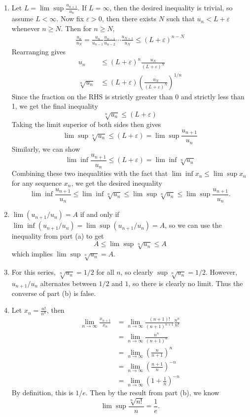 \documentclass[10pt]{amsart}
\theoremstyle{plain}
\theoremstyle{definition}
\begin{document}
\begin{enumerate}
	\item 
		Let $L = \lim\sup \frac{u_{n+1}}{u_n} $. If $L=\infty$, then the desired inequality is trivial, so assume $L < \infty$. Now fix $\varepsilon>0$, then there exists $N$ such that $u_n < L+\varepsilon$ whenever $n \geq N$. Then for $n \geq N$,
		\begin{align*}
			\frac{u_n}{u_N} = \frac{u_n}{u_{n-1}} \frac{u_{n-1}}{u_{n-2}} \cdots \frac{u_{N+1}}{u_{N}} \leq (L+\varepsilon)^{n-N}
		\end{align*}
		Rearranging gives
		\begin{align*}
			u_n &\leq (L+\varepsilon)^n \frac{u_N}{(L+\varepsilon)^N} \\
			\sqrt[n]{u_n} &\leq (L+\varepsilon) \left( \frac{u_N}{(L+\varepsilon)^N}  \right)^{1/n} 
		\end{align*}
		Since the fraction on the RHS is strictly greater than 0 and strictly less than 1, we get the final inequality
		\[
		\sqrt[n]{u_n} \leq (L+\varepsilon)
		\] 
		Taking the limit superior of both sides then gives
		\[
		\lim \sup \sqrt[n]{u_n} \leq (L+\varepsilon) = \lim \sup \frac{u_{n+1}}{u_n} 
		\] 
		Similarly, we can show 
		\[
                \lim \inf \frac{u_{n+1}}{u_n} \leq (L+\varepsilon) = \lim \inf \sqrt[n]{u_n}
		\]
		Combining these two inequalities with the fact that $\lim\inf x_n \leq \lim\sup x_n$ for any sequence $x_n$, we get the desired inequality
		\[
		\lim \inf \frac{u_{n+1}}{u_n} \leq \lim\inf \sqrt[n]{u_n} \leq \lim\sup \sqrt[n]{u_n}  \leq \lim\sup \frac{u_{n+1}}{u_n}.
		\] 

	\item $\lim(u_{n+1}/u_n)=A$ if and only if $\lim\inf (u_{n+1}/u_n) = \lim\sup (u_{n+1}/u_n) = A$, so we can use the inequality from part (a) to get
		 \[
			 A \leq \lim \sup \sqrt[n]{u_n} \leq A
		\] 
		which implies $\lim \sup \sqrt[n]{u_n} = A$.

	\item 
		For this series, $\sqrt[n]{u_n} = 1/2$ for all $n$, so clearly $\sup \sqrt[n]{u_n} =1/2$. However, $u_{n+1}/u_n$ alternates between $1/2$ and $1$, so there is clearly no limit. Thus the converse of part (b) is false.

	\item 
		Let $x_n = \frac{n!}{n^n} $, then
		\begin{align*}
			\lim_{n \to \infty} \frac{x_{n+1}}{x_n} &= \lim_{n \to \infty} \frac{(n+1)!}{(n+1)^{n+1}} \frac{n^n}{n!} \\
								&= \lim_{n \to \infty} \frac{n^n}{(n+1)^n} \\
								&= \lim_{n \to \infty} \left( \frac{n}{n+1} \right)^n \\
								&= \lim_{n \to \infty} \left( \frac{n+1}{n} \right)^{-n} \\
								&= \lim_{n \to \infty} \left( 1+\frac{1}{n}  \right)^{-n}
		\end{align*}
		By definition, this is $1/e$. Then by the result from part (b), we know
		\[
			\lim \sup \frac{\sqrt[n]{n!} }{n} = \frac{1}{e} .
		\] 
\end{enumerate}
\end{document}

